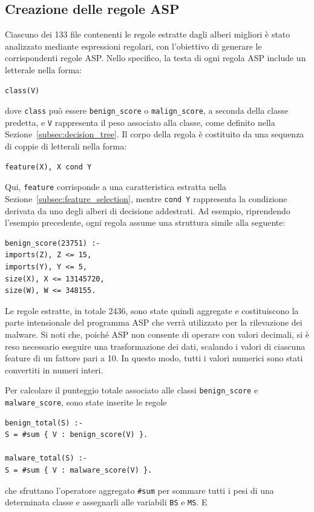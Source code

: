 \begin{multicols}{2}
\subsection{Creazione delle regole ASP}\label{subsec:asp_rules}
Ciascuno dei 133 file contenenti le regole estratte dagli alberi migliori è stato analizzato mediante espressioni regolari, con l'obiettivo di generare le corrispondenti regole ASP. Nello specifico, la testa di ogni regola ASP include un letterale nella forma:  
\begin{verbatim}class(V)\end{verbatim}  
dove \texttt{class} può essere \texttt{benign\_score} o \texttt{malign\_score}, a seconda della classe predetta, e \texttt{V} rappresenta il peso associato alla classe, come definito nella Sezione~\ref{subsec:decision_tree}. Il corpo della regola è costituito da una sequenza di coppie di letterali nella forma:  
\begin{verbatim}feature(X), X cond Y\end{verbatim}  
Qui, \texttt{feature} corrisponde a una caratteristica estratta nella Sezione~\ref{subsec:feature_selection}, mentre \texttt{cond Y} rappresenta la condizione derivata da uno degli alberi di decisione addestrati. Ad esempio, riprendendo l'esempio precedente, ogni regola assume una struttura simile alla seguente:  
\begin{lstlisting}
benign_score(23751) :- 
imports(Z), Z <= 15, 
imports(Y), Y <= 5, 
size(X), X <= 13145720, 
size(W), W <= 348155.
\end{lstlisting}  
Le regole estratte, in totale 2436, sono state quindi aggregate e costituiscono la parte intensionale del programma ASP che verrà utilizzato per la rilevazione dei malware. Si noti che, poiché ASP non consente di operare con valori decimali, si è reso necessario eseguire una trasformazione dei dati, scalando i valori di ciascuna feature di un fattore pari a 10. In questo modo, tutti i valori numerici sono stati convertiti in numeri interi.

Per calcolare il punteggio totale associato alle classi \texttt{benign\_score} e \texttt{malware\_score}, sono state inserite le regole
\begin{lstlisting}
benign_total(S) :- 
S = #sum { V : benign_score(V) }. 

malware_total(S) :-
S = #sum { V : malware_score(V) }.
\end{lstlisting}

che sfruttano l'operatore aggregato \texttt{\#sum} per sommare tutti i pesi di una determinata classe e assegnarli alle variabili \texttt{BS} e \texttt{MS}. E


\end{multicols}
